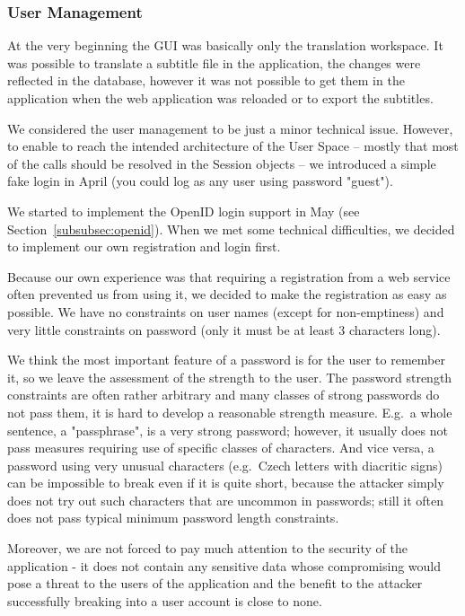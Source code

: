 {\subsubsection{User Management}

At the very beginning the GUI was basically only the translation workspace. It was possible to translate a subtitle file in the application, the changes were reflected in the database, however it was not possible to get them in the application when the web application was reloaded or to export the subtitles.

We considered the user management to be just a minor technical issue. However, to enable to reach the intended architecture of the User Space -- mostly that most of the calls should be resolved in the Session objects -- we introduced a simple fake login in April (you could log as any user using password "guest").

We started to implement the OpenID login support in May (see Section~\ref{subsubsec:openid}). When we met some technical difficulties, we decided to implement our own registration and login first.

Because our own experience was that requiring a registration from a web service often prevented us from using it, we decided to make the registration as easy as possible. We have no constraints on user names (except for non-emptiness) and very little constraints on password (only it must be at least 3 characters long).

We think the most important feature of a password is for the user to remember it, so we leave the assessment of the strength to the user. The password strength constraints are often rather arbitrary and many classes of strong passwords do not pass them, it is hard to develop a reasonable strength measure. E.g.\ a whole sentence, a "passphrase", is a very strong password; however, it usually does not pass measures requiring use of specific classes of characters. And vice versa, a password using very unusual characters (e.g.\ Czech letters with diacritic signs) can be impossible to break even if it is quite short, because the attacker simply does not try out such characters that are uncommon in passwords; still it often does not pass typical minimum password length constraints.

Moreover, we are not forced to pay much attention to the security of the application - it does not contain any sensitive data whose compromising would pose a threat to the users of the application and the benefit to the attacker successfully breaking into a user account is close to none.

}
